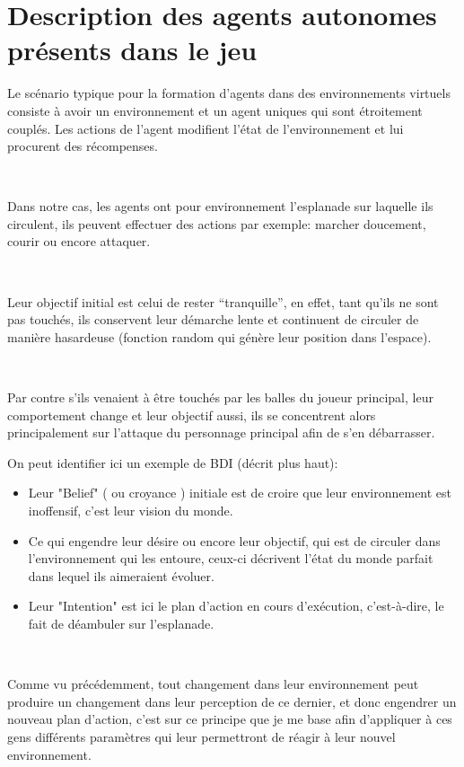 \section{Description des agents autonomes présents dans le jeu}

Le scénario typique pour la formation d’agents dans des environnements virtuels consiste à avoir un environnement et un agent uniques qui sont étroitement couplés. Les actions de l'agent modifient l'état de l'environnement et lui procurent des récompenses. \parencite{unity2}  

~\par
Dans notre cas, les agents ont pour environnement l’esplanade sur laquelle ils circulent, ils peuvent effectuer des actions par exemple:  marcher doucement, courir ou encore attaquer.
 
 
~\par 
Leur objectif initial est celui de rester “tranquille”, en effet, tant qu’ils ne sont pas touchés, ils conservent leur démarche lente et continuent de circuler de manière hasardeuse (fonction random qui génère leur position dans l’espace).

~\par
Par contre s'ils venaient à être touchés par les balles du joueur principal, leur comportement change et leur objectif aussi, ils se concentrent alors principalement sur l’attaque du personnage principal afin de s’en débarrasser.

On peut identifier ici un exemple de BDI (décrit plus haut): 

\begin{itemize}
\item Leur "Belief" ( ou croyance ) initiale est de croire que leur environnement est inoffensif, c’est leur vision du monde.
\item Ce qui engendre leur désire ou encore leur objectif, qui est de circuler dans l’environnement qui les entoure, ceux-ci décrivent l'état du monde parfait dans lequel ils aimeraient évoluer.
\item Leur "Intention" est ici le plan d’action en cours d'exécution, c’est-à-dire, le fait de déambuler sur l’esplanade.
\end{itemize}


~\par
Comme vu précédemment, tout changement dans leur environnement peut produire un changement dans leur perception de ce dernier, et donc engendrer un nouveau plan d’action, c’est sur ce principe que je me base afin d’appliquer à ces gens différents paramètres qui leur permettront de réagir à leur nouvel environnement. 

